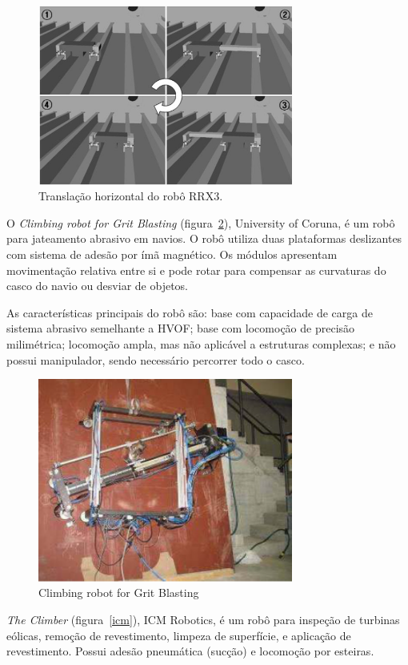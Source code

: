 \begin{figure}[ht]
\centering
\includegraphics[width=8.4cm]{figs/climbers/RRX3_moving.jpg}
\caption{Translação horizontal do robô RRX3.}
\label{rrx3}
\end{figure}

O \emph{Climbing robot for Grit Blasting} (figura~\ref{grit}), University of
Coruna, é um robô para jateamento abrasivo em navios. O robô utiliza duas plataformas deslizantes com sistema de adesão por
ímã magnético. Os módulos apresentam movimentação relativa entre si e pode rotar
para compensar as curvaturas do casco do navio ou desviar de objetos. 

As características principais do robô são: base com
capacidade de carga de sistema abrasivo semelhante a HVOF; base com
locomoção de precisão milimétrica; locomoção ampla, mas não aplicável a
estruturas complexas; e não possui manipulador, sendo necessário percorrer todo
o casco.

\begin{figure}[ht]
\centering
\includegraphics[width=8.4cm]{figs/climbers/grit.png}
\caption{Climbing robot for Grit Blasting}
\label{grit}
\end{figure}

\emph{The Climber} (figura~\ref{icm}), ICM Robotics, é um robô para inspeção de
turbinas eólicas, remoção de revestimento, limpeza de superfície, e aplicação de revestimento.
Possui adesão pneumática (sucção) e locomoção por esteiras. 

